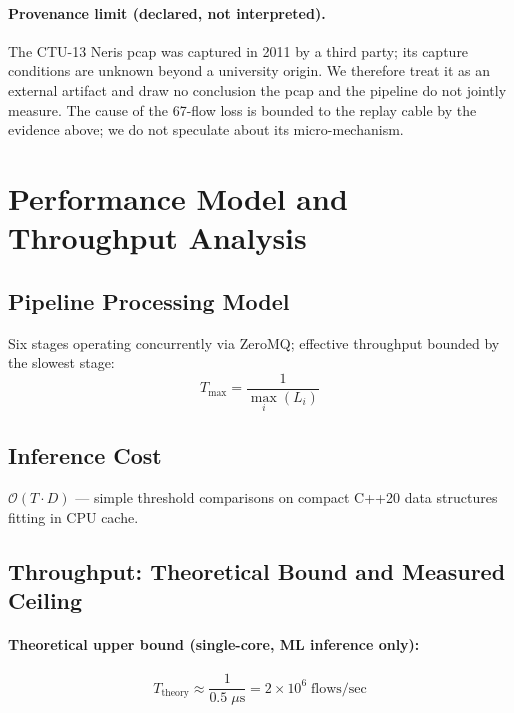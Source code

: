 \documentclass[11pt,a4paper]{article}
\begin{document}
    \paragraph{Provenance limit (declared, not interpreted).}
    The CTU-13 Neris pcap was captured in 2011 by a third party; its capture conditions are
    unknown beyond a university origin. We therefore treat it as an external artifact and draw
    no conclusion the pcap and the pipeline do not jointly measure. The cause of the 67-flow
    loss is bounded to the replay cable by the evidence above; we do not speculate about its
    micro-mechanism.
    \section{Performance Model and Throughput Analysis}

    \subsection{Pipeline Processing Model}

    Six stages operating concurrently via ZeroMQ; effective throughput bounded by the slowest
    stage:
    \begin{equation}
        T_{\max} = \frac{1}{\max_i(L_i)}
    \end{equation}

    \subsection{Inference Cost}

    $\mathcal{O}(T \cdot D)$ --- simple threshold comparisons on compact C++20 data structures
    fitting in CPU cache.

    \subsection{Throughput: Theoretical Bound and Measured Ceiling}

    \paragraph{Theoretical upper bound (single-core, ML inference only):}
    \begin{equation}
        T_{\text{theory}} \approx \frac{1}{0.5\;\mu\text{s}} = 2 \times 10^6\;\text{flows/sec}
    \end{equation}
\end{document}
